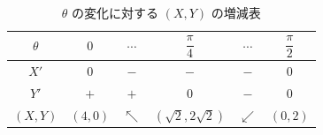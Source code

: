 \documentclass[../../main.tex]{subfiles}
\begin{document}
\begin{table}[htb]
  \centering
  \caption{$\theta$ の変化に対する $(X,Y)$ の増減表}
  \label{tab:1974_5_variation}
  \renewcommand{\arraystretch}{1.35}
  \begin{tabular}{|c|c|c|c|c|c|}
    \hline
    $\theta$ & $0$ & $\cdots$ & $\dfrac{\pi}{4}$ & $\cdots$ & $\dfrac{\pi}{2}$ \\
    \hline
    $X'$ & $0$ & $-$ & $-$ & $-$ & $0$ \\
    \hline
    $Y'$ & $+$ & $+$ & $0$ & $-$ & $0$ \\
    \hline
    $(X,Y)$ & $(4,0)$ & $\nwarrow$ & $(\sqrt{2},2\sqrt{2})$ & $\swarrow$ & $(0,2)$ \\
    \hline
  \end{tabular}
\end{table}
\end{document}
